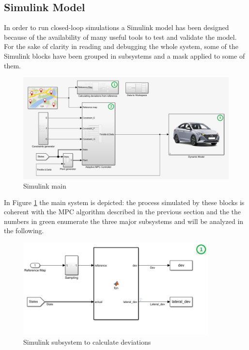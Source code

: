 \subsection{Simulink Model}

In order to run closed-loop simulations a Simulink model has been designed because of the availability of many useful tools to test and validate the model. For the sake of clarity in reading and debugging the whole system, some of the Simulink blocks have been grouped in subsystems and a mask applied to some of them. 
\begin{figure}[H]
    \centering
    \includegraphics[width=\textwidth]{Figures/simulink_main_mod.png}
    \caption{Simulink main}
    \label{fig:simulink_main_mod}
\end{figure} 
In Figure \ref{fig:simulink_main_mod} the main system is depicted: the process simulated by these blocks is coherent with the MPC algorithm described in the previous section and the the numbers in green enumerate the three major subsystems and will be analyzed in the following.
\begin{figure}[H]
    \centering
    \includegraphics[width=0.9\textwidth]{Figures/simulink_deviations_mod.png}
    \caption{Simulink subsystem to calculate deviations}
    \label{fig:simulink_deviations_mod}
\end{figure}

